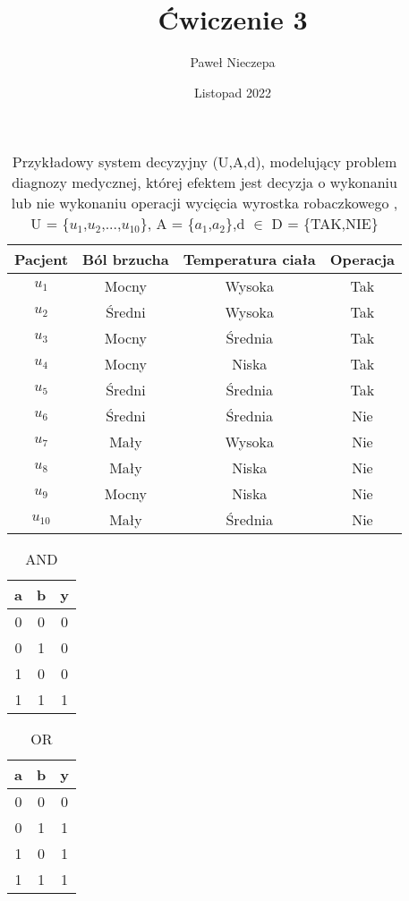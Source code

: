 \documentclass[a4paper]{article}
\title{Ćwiczenie 3}
\author{Paweł Nieczepa}
\date{Listopad 2022}
\begin{document}
\maketitle






\begin{table}[h]
\centering\caption{Przykładowy system decyzyjny (U,A,d), modelujący problem diagnozy medycznej, której efektem jest decyzja o wykonaniu lub nie wykonaniu operacji wycięcia wyrostka robaczkowego  , \\U = \{$u_{1}$,$u_{2}$,...,$u_{10}$\}, A = \{$a_{1}$,$a_{2}$\},d $\in$ D  = \{TAK,NIE\} }
\begin{tabular}{c|c c c} \hline \hline
Pacjent & Ból brzucha & Temperatura ciała & Operacja\\ \hline 
$u_{1}$ & Mocny & Wysoka &  Tak\\
$u_{2}$ & Średni & Wysoka &  Tak\\
$u_{3}$ & Mocny & Średnia &  Tak\\
$u_{4}$ & Mocny & Niska &  Tak\\
$u_{5}$ & Średni & Średnia &  Tak\\
$u_{6}$ & Średni & Średnia &  Nie\\
$u_{7}$ & Mały & Wysoka &  Nie\\
$u_{8}$ & Mały & Niska  &  Nie\\
$u_{9}$ & Mocny & Niska &  Nie\\
$u_{10}$ & Mały & Średnia &  Nie\\ 
\hline 
\hline
\end{tabular}
\end{table}

\begin{table}[h]
\centering\caption{AND}
\begin{tabular}{c c|c}
a & b & y \\ \hline
0 & 0 & 0\\
0 & 1 & 0\\
1 & 0 & 0\\
1 & 1 & 1\\
\end{tabular}
\end{table}

\begin{table}[h]
\centering\caption{OR}
\begin{tabular}{c c|c}
a & b & y \\ \hline
0 & 0 & 0\\
0 & 1 & 1\\
1 & 0 & 1\\
1 & 1 & 1\\
\end{tabular}
\end{table}
\end{document}
